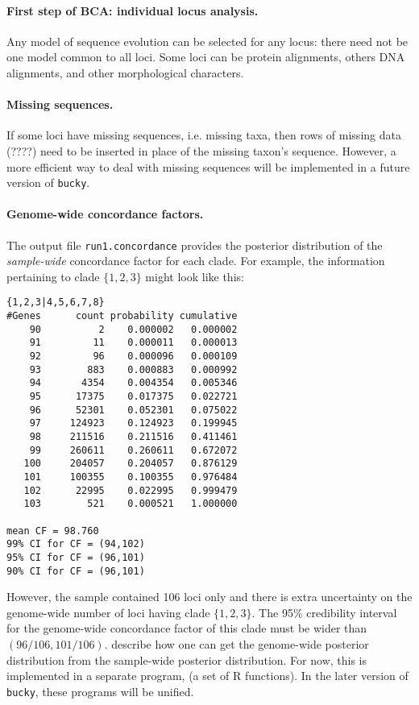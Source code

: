 \documentclass[12pt,english,final,letterpaper]{article}
\begin{document}
\paragraph{First step of BCA: individual locus analysis.}
Any model of sequence evolution can be selected for any locus: there need 
not be one model common to all loci. Some loci can be protein alignments,
others DNA alignments, and other morphological characters.

\paragraph{Missing sequences.}
If some loci have missing sequences, i.e. missing taxa, then
rows of missing data (????) need to be inserted in place of the missing 
taxon's sequence. However, a more efficient way to deal with missing 
sequences will be implemented in a future version of {\tt bucky}.

\paragraph{Genome-wide concordance factors.}
The output file {\tt run1.concordance} provides the posterior
distribution of the {\em sample-wide} concordance factor for each clade. For
example, the information pertaining to clade $\{1,2,3\}$ might look like this:
\begin{verbatim}
{1,2,3|4,5,6,7,8}
#Genes      count probability cumulative
    90          2    0.000002   0.000002
    91         11    0.000011   0.000013
    92         96    0.000096   0.000109
    93        883    0.000883   0.000992
    94       4354    0.004354   0.005346
    95      17375    0.017375   0.022721
    96      52301    0.052301   0.075022
    97     124923    0.124923   0.199945
    98     211516    0.211516   0.411461
    99     260611    0.260611   0.672072
   100     204057    0.204057   0.876129
   101     100355    0.100355   0.976484
   102      22995    0.022995   0.999479
   103        521    0.000521   1.000000

mean CF = 98.760
99% CI for CF = (94,102)
95% CI for CF = (96,101)
90% CI for CF = (96,101)
\end{verbatim}
However, the sample contained 106 loci only and there is extra uncertainty
on the genome-wide number of loci having clade $\{1,2,3\}$. The 95\%
credibility interval for the genome-wide concordance factor of this clade
must be wider than $(96/106, 101/106)$. \cite{ane-etal-2006} describe how
one can get the genome-wide posterior distribution from the sample-wide
posterior distribution. For now, this is implemented in a separate program,
(a set of R functions). 
In the later version of {\tt bucky}, these programs will be unified.
\end{document}
